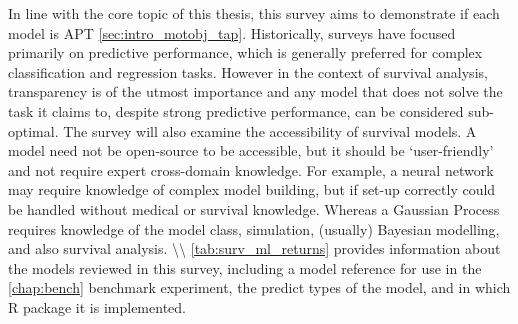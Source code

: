 \documentclass[
  letterpaper,
]{scrbook}
\theoremstyle{plain}
\theoremstyle{definition}
\theoremstyle{remark}
\begin{document}
In line with the core topic of this thesis, this survey aims to
demonstrate if each model is APT \ref{sec:intro_motobj_tap}.
Historically, surveys have focused primarily on predictive performance,
which is generally preferred for complex classification and regression
tasks. However in the context of survival analysis, transparency is of
the utmost importance and any model that does not solve the task it
claims to, despite strong predictive performance, can be considered
sub-optimal. The survey will also examine the accessibility of survival
models. A model need not be open-source to be accessible, but it should
be `user-friendly' and not require expert cross-domain knowledge. For
example, a neural network may require knowledge of complex model
building, but if set-up correctly could be handled without medical or
survival knowledge. Whereas a Gaussian Process requires knowledge of the
model class, simulation, (usually) Bayesian modelling, and also survival
analysis. \textbackslash\textbackslash{} \ref{tab:surv_ml_returns}
provides information about the models reviewed in this survey, including
a model reference for use in the \ref{chap:bench} benchmark experiment,
the predict types of the model, and in which \textsf{R}{} package it is
implemented.
\end{document}
